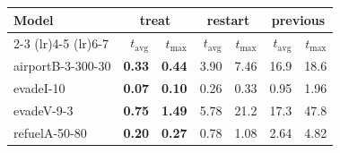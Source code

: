 \begin{tabular}{lrrrrrr}
\toprule
\multirow{2}{*}{Model} & \multicolumn{2}{c}{treat} & \multicolumn{2}{c}{restart} & \multicolumn{2}{c}{previous} \\
    \cmidrule(lr){2-3} \cmidrule(lr){4-5} \cmidrule(lr){6-7}
 & $t_\text{avg}$ & $t_\text{max}$ & $t_\text{avg}$ & $t_\text{max}$ & $t_\text{avg}$ & $t_\text{max}$ \\
\midrule
airportB-3-300-30 & \textbf{0.33} & \textbf{0.44} & 3.90 & 7.46 & 16.9 & 18.6 \\
evadeI-10 & \textbf{0.07} & \textbf{0.10} & 0.26 & 0.33 & 0.95 & 1.96 \\
evadeV-9-3 & \textbf{0.75} & \textbf{1.49} & 5.78 & 21.2 & 17.3 & 47.8 \\
refuelA-50-80 & \textbf{0.20} & \textbf{0.27} & 0.78 & 1.08 & 2.64 & 4.82 \\
\bottomrule
\end{tabular}
